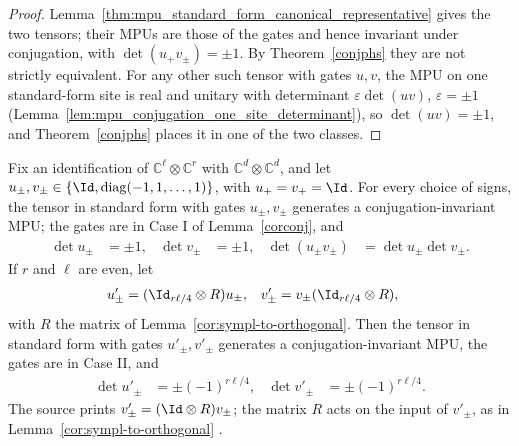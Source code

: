 \begin{proof}
    \leanok
    Lemma~\ref{thm:mpu_standard_form_canonical_representative} gives the two
    tensors; their MPUs are those of the gates and hence invariant under
    conjugation, with $\det(u_+v_\pm)=\pm1$. By Theorem~\ref{conjphs} they are not
    strictly equivalent. For any other such tensor with gates $u,v$, the MPU on one
    standard-form site is real and unitary with determinant $\varepsilon\det(uv)$,
    $\varepsilon=\pm1$
    (Lemma~\ref{lem:mpu_conjugation_one_site_determinant}), so $\det(uv)=\pm1$, and
    Theorem~\ref{conjphs} places it in one of the two classes.
\end{proof}

\begin{lemma}
    \label{lem:mpu_conjugation_example_gate_invariants}
    \leanok
    Fix an identification of $\mathbb C^\ell\otimes\mathbb C^r$ with
    $\mathbb C^d\otimes\mathbb C^d$, and let
    $u_\pm,v_\pm\in\{\Id,\operatorname{diag}(-1,1,\ldots,1)\}$, with $u_+=v_+=\Id$.
    For every choice of signs, the tensor in standard form with gates
    $u_\pm,v_\pm$ generates a conjugation-invariant MPU; the gates are in
    Case I of Lemma~\ref{corconj}, and
    \begin{align}
        \det u_\pm & =\pm1, & \det v_\pm & =\pm1, & \det(u_\pm v_\pm) & =\det u_\pm\det v_\pm.
    \end{align}
    If $r$ and $\ell$ are even, let
    \begin{align}
        u'_\pm & =(\Id_{r\ell/4}\otimes R)u_\pm, &
        v'_\pm & =v_\pm(\Id_{r\ell/4}\otimes R),
    \end{align}
    with $R$ the matrix of Lemma~\ref{cor:sympl-to-orthogonal}. Then the
    tensor in standard form with gates $u'_\pm,v'_\pm$ generates a
    conjugation-invariant MPU, the gates are in Case II, and
    \begin{align}
        \det u'_\pm & =\pm(-1)^{r\ell/4}, & \det v'_\pm & =\pm(-1)^{r\ell/4}.
    \end{align}
    The source prints $v'_\pm=(\Id\otimes R)v_\pm$; the matrix $R$ acts on
    the input of $v'_\pm$, as in Lemma~\ref{cor:sympl-to-orthogonal}
    \cite{gap:mpu_conjugation_example_r_side}.
\end{lemma}

